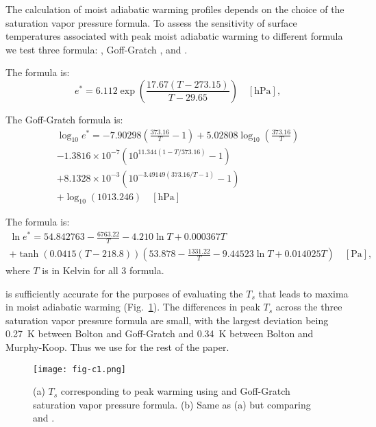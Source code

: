 \documentclass[draft]{ametsocV6.1}
\begin{document}
\appendix[C] 
\label{app:svp}
The calculation of moist adiabatic warming profiles depends on the choice of the saturation vapor pressure formula. To assess the sensitivity of surface temperatures associated with peak moist adiabatic warming to different formula we test three formula: \cite{bolton1980}, Goff-Gratch \citep{list1949}, and \cite{murphy2005}.

The \cite{bolton1980} formula is:
\begin{equation}
e^* = 6.112 \exp\left(\frac{17.67 (T - 273.15)}{T - 29.65}\right) \quad [\text{hPa}],
\label{eq:bolton}
\end{equation}

The Goff-Gratch formula is:
\begin{multline}
\log_{10} e^* = -7.90298 \left(\frac{373.16}{T} - 1\right) + 5.02808 \log_{10}\left(\frac{373.16}{T}\right)\\ - 1.3816 \times 10^{-7} \left(10^{11.344 (1 - T/373.16)} - 1\right)\\ + 8.1328 \times 10^{-3} \left(10^{-3.49149 (373.16/T - 1)} - 1\right)\\ + \log_{10}(1013.246) \quad [\text{hPa}]
\end{multline}

The \cite{murphy2005} formula is:
\begin{multline}
\ln e^* = 54.842763 - \frac{6763.22}{T} - 4.210 \ln T + 0.000367 T\\ + \tanh\left(0.0415 (T - 218.8)\right) \left(53.878 - \frac{1331.22}{T} - 9.44523 \ln T + 0.014025 T\right) \quad [\text{Pa}],
\end{multline}
where $T$ is in Kelvin for all 3 formula.

\cite{bolton1980} is sufficiently accurate for the purposes of evaluating the $T_s$ that leads to maxima in moist adiabatic warming (Fig.~\ref{fig:fig-c1}). The differences in peak $T_s$ across the three saturation vapor pressure formula are small, with the largest deviation being 0.27~K between Bolton and Goff-Gratch and 0.34~K between Bolton and Murphy-Koop. Thus we use \cite{bolton1980} for the rest of the paper.

\begin{figure}[htbp]
 \centering
 \texttt{[image: fig-c1.png]}
 \caption{(a) $T_s$ corresponding to peak warming using \cite{bolton1980} and Goff-Gratch saturation vapor pressure formula. (b) Same as (a) but comparing \cite{bolton1980} and \cite{murphy2005}.}\label{fig:fig-c1}
\end{figure}

\clearpage




\end{document}
